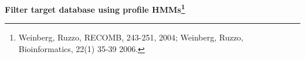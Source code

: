 \documentclass[landscape]{slides}
\begin{document}
\begin{slide}
\end{slide}
\begin{slide}
\begin{center}
\large
\textbf{Filter target database using profile HMMs\footnote{Weinberg,
    Ruzzo, RECOMB, 243-251, 2004; Weinberg, Ruzzo, Bioinformatics,
    22(1) 35-39 2006.}}
\end{center}


\vfill
\end{slide}
\end{document}
